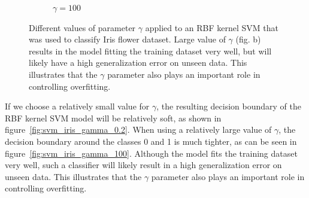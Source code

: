 \documentclass[11pt]{article}
\begin{document}
\begin{figure}[hbt!]
\begin{subfigure}[t]{.48\textwidth}
            \caption{$\gamma=100$}
            \label{fig:iris_svm_gamma_100}
        \end{subfigure}
        \caption{Different values of parameter $\gamma$ applied to an RBF kernel SVM that was used to classify Iris flower dataset. Large value of $\gamma$ (fig. b) results in the model fitting the training dataset very well, but will likely have a high generalization error on unseen data. This illustrates that the $\gamma$ parameter also plays an important role in controlling overfitting.}
        \label{fig:iris_svm_rbf}
    \end{figure}

    If we choose a relatively small value for $\gamma$, the resulting decision boundary of the RBF kernel SVM model will be relatively soft, as shown in figure~\ref{fig:svm_iris_gamma_0.2}. When using a relatively large value of $\gamma$, the decision boundary around the classes 0 and 1 is much tighter, as can be seen in figure~\ref{fig:svm_iris_gamma_100}. Although the model fits the training dataset very well, such a classifier will likely result in a high generalization error on unseen data. This illustrates that the $\gamma$ parameter also plays an important role in controlling overfitting.


    
    
\end{document}

